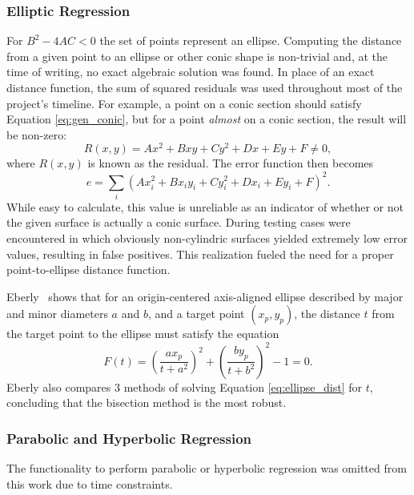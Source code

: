 \subsubsection{Elliptic Regression}\label{sec:elliptic_reg}
For $B^2 - 4AC < 0$ the set of points represent an ellipse.
Computing the distance from a given point to an ellipse or other conic shape is non-trivial and, at the time of writing, no exact algebraic solution was found.
In place of an exact distance function, the sum of squared residuals was used throughout most of the project's timeline.
For example, a point on a conic section should satisfy Equation \ref{eq:gen_conic}, but for a point \textit{almost} on a conic section, the result will be non-zero:
\begin{equation}
	R(x,y) = Ax^2 + Bxy + Cy^2 + Dx + Ey + F \neq 0,
\end{equation}
where $R(x,y)$ is known as the residual. The error function then becomes
\begin{equation}
	e = \sum_i \left(Ax_i^2 + Bx_i y_i + Cy_i^2 + Dx_i + Ey_i + F\right)^2.
\end{equation}
While easy to calculate, this value is unreliable as an indicator of whether or not the given surface is actually a conic surface.
During testing cases were encountered in which obviously non-cylindric surfaces yielded extremely low error values, resulting in false positives.
This realization fueled the need for a proper point-to-ellipse distance function.

Eberly~\cite{GeoTools_pt_to_ellipse} shows that for an origin-centered axis-aligned ellipse described by major and minor diameters $a$ and $b$, and a target point $(x_p, y_p)$, the distance $t$ from the target point to the ellipse must satisfy the equation
\begin{equation}\label{eq:ellipse_dist}
	F(t) = \left(\frac{a x_p}{t + a^2}\right)^2 + \left(\frac{b y_p}{t + b^2}\right)^2 - 1 = 0.
\end{equation}
Eberly also compares 3 methods of solving Equation \ref{eq:ellipse_dist} for $t$, concluding that the bisection method is the most robust.

\subsubsection{Parabolic and Hyperbolic Regression}
The functionality to perform parabolic or hyperbolic regression was omitted from this work due to time constraints.

